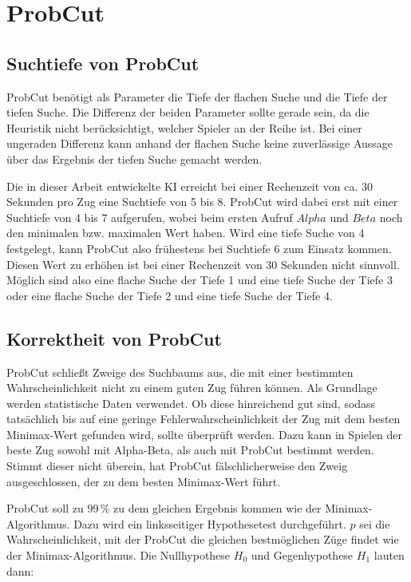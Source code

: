 
\section{ProbCut}

\subsection{Suchtiefe von ProbCut}
ProbCut benötigt als Parameter die Tiefe der flachen Suche und die Tiefe der tiefen Suche. Die Differenz der beiden
Parameter sollte gerade sein, da die Heuristik nicht berücksichtigt, welcher Spieler an der Reihe ist. Bei einer
ungeraden Differenz kann anhand der flachen Suche keine zuverlässige Aussage über das Ergebnis der tiefen Suche gemacht
werden.

Die in dieser Arbeit entwickelte KI erreicht bei einer Rechenzeit von ca. 30 Sekunden pro Zug eine Suchtiefe von 5 bis
8. ProbCut wird dabei erst mit einer Suchtiefe von 4 bis 7 aufgerufen, wobei beim ersten Aufruf $Alpha$ und $Beta$ noch
den minimalen bzw. maximalen Wert haben. Wird eine tiefe Suche von 4 festgelegt, kann ProbCut also frühestens bei
Suchtiefe 6 zum Einsatz kommen. Diesen Wert zu erhöhen ist bei einer Rechenzeit von 30 Sekunden nicht sinnvoll. Möglich
sind also eine flache Suche der Tiefe 1 und eine tiefe Suche der Tiefe 3 oder eine flache Suche der Tiefe 2 und eine
tiefe Suche der Tiefe 4.

\subsection{Korrektheit von ProbCut}
ProbCut schließt Zweige des Suchbaums aus, die mit einer bestimmten Wahrscheinlichkeit nicht zu einem guten Zug führen
können. Als Grundlage werden statistische Daten verwendet. Ob diese hinreichend gut sind, sodass tatsächlich bis auf
eine geringe Fehlerwahrscheinlichkeit der Zug mit dem besten Minimax-Wert gefunden wird, sollte überprüft werden. Dazu
kann in Spielen der beste Zug sowohl mit Alpha-Beta, als auch mit ProbCut bestimmt werden. Stimmt dieser nicht überein,
hat ProbCut fälschlicherweise den Zweig ausgeschlossen, der zu dem besten Minimax-Wert führt.

ProbCut soll zu 99\,\% zu dem gleichen Ergebnis kommen wie der Minimax-Algorithmus. Dazu wird ein linksseitiger
Hypothesetest durchgeführt. $p$ sei die Wahrscheinlichkeit, mit der ProbCut die gleichen bestmöglichen Züge findet wie
der Minimax-Algorithmus. Die Nullhypothese $H_0$ und Gegenhypothese $H_1$ lauten dann:

